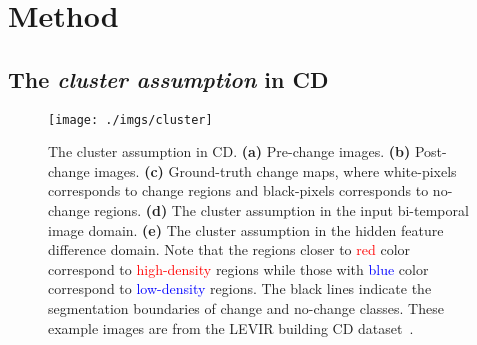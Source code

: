 \documentclass[runningheads]{llncs}
\begin{document}
\section{Method}
\vspace{-3mm}
\subsection{The \textit{cluster assumption} in CD}
\label{sec:cluster_assumption}
\begin{figure}[!htb]
    \centering
    \texttt{[image: ./imgs/cluster]}
    \caption{The cluster assumption in CD. \textbf{(a)} Pre-change images. \textbf{(b)} Post-change images. \textbf{(c)} Ground-truth change maps, where white-pixels corresponds to change regions and black-pixels corresponds to no-change regions. \textbf{(d)} The cluster assumption in the input bi-temporal image domain. \textbf{(e)} The cluster assumption in the hidden feature difference domain. Note that the regions closer to \textcolor{red}{red} color correspond to \textcolor{red}{high-density} regions while those with \textcolor{blue}{blue} color correspond to \textcolor{blue}{low-density} regions. The black lines indicate the segmentation boundaries of change and no-change classes. These example images are from the LEVIR building CD dataset~\cite{levid-cd}. \vspace{-5mm}}
\label{fig:cluster_assump}
\end{figure}
\vspace{-3mm}
\end{document}
